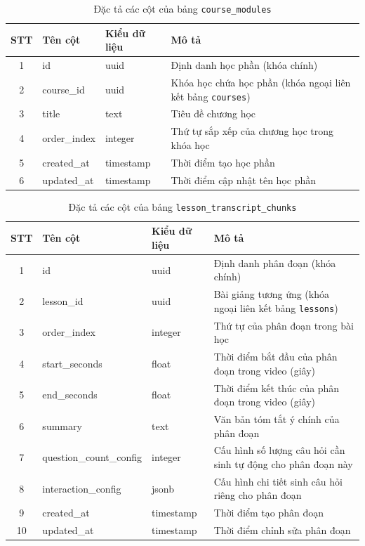 \documentclass[../DoAn.tex]{subfiles}
\begin{document}
\begin{table}[H]
\centering
\small
\renewcommand{\arraystretch}{1.3}
\begin{tabular}{|c|l|l|p{6.2cm}|}
\hline
\textbf{STT} & \textbf{Tên cột} & \textbf{Kiểu dữ liệu} & \textbf{Mô tả} \\ \hline
1 & id & uuid & Định danh học phần (khóa chính) \\ \hline
2 & course\_id & uuid & Khóa học chứa học phần (khóa ngoại liên kết bảng \texttt{courses}) \\ \hline
3 & title & text & Tiêu đề chương học \\ \hline
4 & order\_index & integer & Thứ tự sắp xếp của chương học trong khóa học \\ \hline
5 & created\_at & timestamp & Thời điểm tạo học phần \\ \hline
6 & updated\_at & timestamp & Thời điểm cập nhật tên học phần \\ \hline
\end{tabular}
\caption{Đặc tả các cột của bảng \texttt{course\_modules}}
\label{tbl:course_modules}
\end{table}

\begin{table}[H]
\centering
\small
\renewcommand{\arraystretch}{1.3}
\begin{tabular}{|c|l|l|p{6.2cm}|}
\hline
\textbf{STT} & \textbf{Tên cột} & \textbf{Kiểu dữ liệu} & \textbf{Mô tả} \\ \hline
1 & id & uuid & Định danh phân đoạn (khóa chính) \\ \hline
2 & lesson\_id & uuid & Bài giảng tương ứng (khóa ngoại liên kết bảng \texttt{lessons}) \\ \hline
3 & order\_index & integer & Thứ tự của phân đoạn trong bài học \\ \hline
4 & start\_seconds & float & Thời điểm bắt đầu của phân đoạn trong video (giây) \\ \hline
5 & end\_seconds & float & Thời điểm kết thúc của phân đoạn trong video (giây) \\ \hline
6 & summary & text & Văn bản tóm tắt ý chính của phân đoạn \\ \hline
7 & question\_count\_config & integer & Cấu hình số lượng câu hỏi cần sinh tự động cho phân đoạn này \\ \hline
8 & interaction\_config & jsonb & Cấu hình chi tiết sinh câu hỏi riêng cho phân đoạn \\ \hline
9 & created\_at & timestamp & Thời điểm tạo phân đoạn \\ \hline
10 & updated\_at & timestamp & Thời điểm chỉnh sửa phân đoạn \\ \hline
\end{tabular}
\caption{Đặc tả các cột của bảng \texttt{lesson\_transcript\_chunks}}
\label{tbl:lesson_transcript_chunks}
\end{table}
\end{document}
